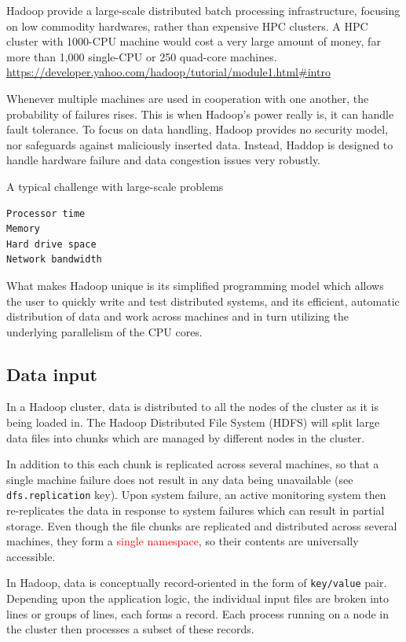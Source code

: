 Hadoop provide a large-scale distributed batch processing infrastructure,
focusing on low commodity hardwares, rather than expensive HPC clusters.
A HPC cluster with 1000-CPU machine would cost
a very large amount of money, far more than 1,000 single-CPU or 250 quad-core
machines.
\url{https://developer.yahoo.com/hadoop/tutorial/module1.html#intro}

Whenever multiple machines are used in cooperation with one another, the
probability of failures rises. This is when Hadoop's power really is, it can
handle fault tolerance. To focus on data handling, Hadoop provides no security
model, nor safeguards against maliciously inserted data.
Instead, Haddop is designed to handle hardware failure and data congestion
issues very robustly.

A typical challenge with large-scale problems
\begin{verbatim}
Processor time
Memory
Hard drive space
Network bandwidth
\end{verbatim}

What makes Hadoop unique is its simplified programming model which allows the
user to quickly write and test distributed systems, and its efficient, automatic
distribution of data and work across machines and in turn utilizing the
underlying parallelism of the CPU cores. 

\subsection{Data input}

In a Hadoop cluster, data is distributed to all the nodes of the cluster as it
is being loaded in. The Hadoop Distributed File System (HDFS) will split large
data files into chunks which are managed by different nodes in the cluster.

In addition to this each chunk is replicated across several machines, so that a
single machine failure does not result in any data being unavailable (see
\verb!dfs.replication! key). Upon system failure, an active monitoring system
then re-replicates the data in response to system failures which can result in
partial storage.
Even though the file chunks are replicated and distributed across several
machines, they form a \textcolor{red}{single namespace}, so their contents are
universally accessible.

In Hadoop,  data is conceptually record-oriented in the form of \verb!key/value!
pair. Depending upon the application logic, the individual input files are
broken into lines or groups of lines, each forms a record.
Each process running on a node in the cluster then processes a subset of these
records.

